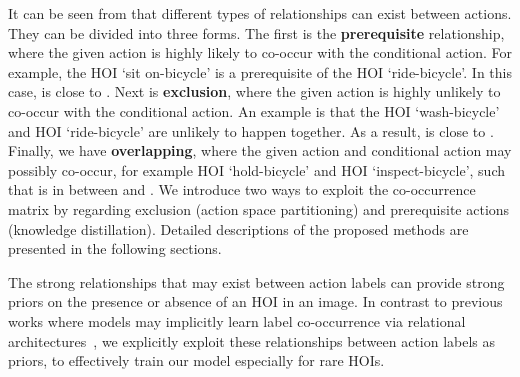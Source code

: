 It can be seen from  that different types of relationships can exist between actions. 
They can be divided into three forms.
The first is the \textbf{prerequisite} relationship, where the given action is highly likely to co-occur with the conditional action. 
For example, the HOI `sit on-bicycle' is a prerequisite of the HOI `ride-bicycle'. 
In this case, 
 is close to .
Next is \textbf{exclusion}, where the given action is highly unlikely to co-occur with the conditional action. An example is that the HOI `wash-bicycle' and HOI `ride-bicycle' are unlikely to happen together. 
As a result,  is close to .
Finally, we have \textbf{overlapping}, where the given action and conditional action may possibly co-occur, for example HOI `hold-bicycle' and HOI `inspect-bicycle', such that  is in between  and .
We introduce two 
ways to exploit the co-occurrence matrix by regarding exclusion (action space partitioning) and prerequisite actions (knowledge distillation). 
Detailed descriptions of the proposed methods are presented in the following sections.





The strong relationships that may exist between action labels can provide strong priors on the presence or absence of an HOI in an image. 
{In contrast to previous works where models may implicitly learn label co-occurrence via relational architectures~\cite{baradel2018object,zhang2019co}, we explicitly exploit these relationships between action labels as priors, to effectively train our model especially for rare HOIs.}













